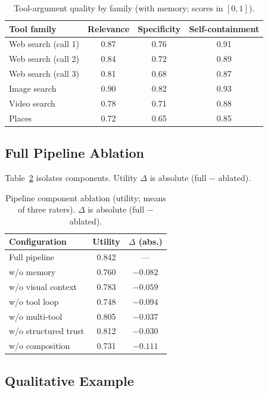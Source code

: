 \documentclass[11pt,a4paper]{article}
\begin{document}
\begin{table}[t]
\centering
\caption{Tool-argument quality by family (with memory; scores in $[0,1]$).}
\label{tab:query_quality}
\begin{tabular}{lccc}
\toprule
\textbf{Tool family} & \textbf{Relevance} & \textbf{Specificity} & \textbf{Self-containment} \\
\midrule
Web search (call 1) & 0.87 & 0.76 & 0.91 \\
Web search (call 2) & 0.84 & 0.72 & 0.89 \\
Web search (call 3) & 0.81 & 0.68 & 0.87 \\
Image search & 0.90 & 0.82 & 0.93 \\
Video search & 0.78 & 0.71 & 0.88 \\
Places & 0.72 & 0.65 & 0.85 \\
\bottomrule
\end{tabular}
\end{table}

\subsection{Full Pipeline Ablation}

Table~\ref{tab:ablation} isolates components. Utility $\Delta$ is absolute (full $-$ ablated).

\begin{table}[t]
\centering
\caption{Pipeline component ablation (utility; means of three raters). $\Delta$ is absolute (full $-$ ablated).}
\label{tab:ablation}
\begin{tabular}{lcc}
\toprule
\textbf{Configuration} & \textbf{Utility} & \textbf{$\Delta$ (abs.)} \\
\midrule
Full pipeline & 0.842 & --- \\
w/o memory & 0.760 & $-0.082$ \\
w/o visual context & 0.783 & $-0.059$ \\
w/o tool loop & 0.748 & $-0.094$ \\
w/o multi-tool & 0.805 & $-0.037$ \\
w/o structured trust & 0.812 & $-0.030$ \\
w/o composition & 0.731 & $-0.111$ \\
\bottomrule
\end{tabular}
\end{table}

\subsection{Qualitative Example}
\end{document}
